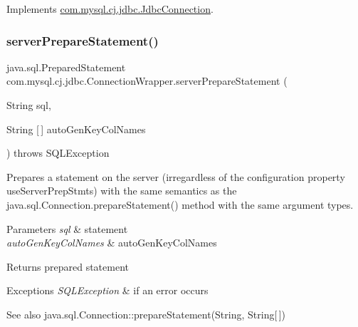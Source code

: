 Implements \mbox{\hyperlink{interfacecom_1_1mysql_1_1cj_1_1jdbc_1_1_jdbc_connection_aefdad3d71436ba1c80d2cb1e8419dfba}{com.\+mysql.\+cj.\+jdbc.\+Jdbc\+Connection}}.

\mbox{\label{classcom_1_1mysql_1_1cj_1_1jdbc_1_1_connection_wrapper_a02f353527ecf3306019227fa68d014a7}} 
\subsubsection{\texorpdfstring{server\+Prepare\+Statement()}{serverPrepareStatement()}\hspace{0.1cm}{\footnotesize\ttfamily [6/6]}}
{\footnotesize\ttfamily java.\+sql.\+Prepared\+Statement com.\+mysql.\+cj.\+jdbc.\+Connection\+Wrapper.\+server\+Prepare\+Statement (\begin{DoxyParamCaption}\item[{String}]{sql,  }\item[{String \mbox{[}$\,$\mbox{]}}]{auto\+Gen\+Key\+Col\+Names }\end{DoxyParamCaption}) throws S\+Q\+L\+Exception}

Prepares a statement on the server (irregardless of the configuration property \textquotesingle{}use\+Server\+Prep\+Stmts\textquotesingle{}) with the same semantics as the java.\+sql.\+Connection.\+prepare\+Statement() method with the same argument types.


\begin{DoxyParams}{Parameters}
{\em sql} & statement \\
\hline
{\em auto\+Gen\+Key\+Col\+Names} & auto\+Gen\+Key\+Col\+Names \\
\hline
\end{DoxyParams}
\begin{DoxyReturn}{Returns}
prepared statement 
\end{DoxyReturn}

\begin{DoxyExceptions}{Exceptions}
{\em S\+Q\+L\+Exception} & if an error occurs\\
\hline
\end{DoxyExceptions}
\begin{DoxySeeAlso}{See also}
java.\+sql.\+Connection\+::prepare\+Statement(\+String, String\mbox{[}$\,$\mbox{]}) 
\end{DoxySeeAlso}


